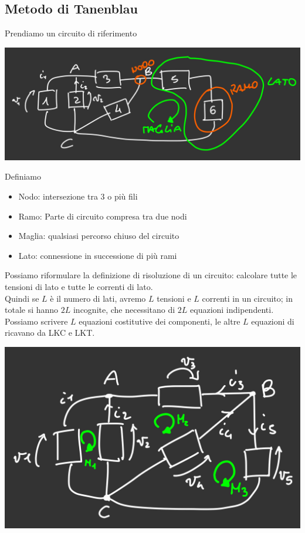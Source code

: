 \documentclass{article}
\begin{document}
\subsection{Metodo di Tanenblau}
Prendiamo un circuito di riferimento
\begin{center}
    \includegraphics[scale=0.35]{Image/Metodo di Tanenblau_1.png}
\end{center}
Definiamo
\begin{itemize} 
    \item Nodo: intersezione tra 3 o più fili
    \item Ramo: Parte di circuito compresa tra due nodi
    \item Maglia: qualsiasi percorso chiuso del circuito
    \item Lato: connessione in successione di più rami
\end{itemize}
Possiamo riformulare la definizione di risoluzione di un circuito: calcolare tutte le tensioni di lato e tutte le correnti di lato.\\
Quindi se $L$ è il numero di lati, avremo $L$ tensioni e $L$ correnti in un circuito; in totale si hanno $2L$ incognite, che necessitano di $2L$ equazioni indipendenti.
\vspace*{0.2cm}\\
Possiamo scrivere $L$ equazioni costitutive dei componenti, le altre $L$ equazioni di ricavano da LKC e LKT.
\begin{center}
    \includegraphics[scale=0.3]{Image/Metodo di Tanenblau_2.png}
\end{center}
\end{document}
